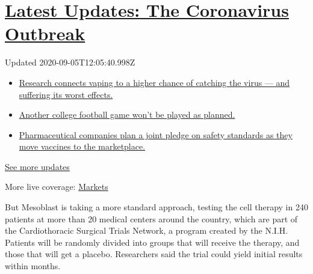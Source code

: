 \hypertarget{latest-updates-the-coronavirus-outbreak}{%
\section{\texorpdfstring{\href{https://www.nytimes3xbfgragh.onion/2020/09/04/world/covid-19-coronavirus.html?action=click\&pgtype=Article\&state=default\&region=MAIN_CONTENT_1\&context=storylines_live_updates}{Latest
Updates: The Coronavirus
Outbreak}}{Latest Updates: The Coronavirus Outbreak}}\label{latest-updates-the-coronavirus-outbreak}}

Updated 2020-09-05T12:05:40.998Z

\begin{itemize}
\tightlist
\item
  \href{https://www.nytimes3xbfgragh.onion/2020/09/04/world/covid-19-coronavirus.html?action=click\&pgtype=Article\&state=default\&region=MAIN_CONTENT_1\&context=storylines_live_updates\#link-1654f6ad}{Research
  connects vaping to a higher chance of catching the virus --- and
  suffering its worst effects.}
\item
  \href{https://www.nytimes3xbfgragh.onion/2020/09/04/world/covid-19-coronavirus.html?action=click\&pgtype=Article\&state=default\&region=MAIN_CONTENT_1\&context=storylines_live_updates\#link-52e4198a}{Another
  college football game won't be played as planned.}
\item
  \href{https://www.nytimes3xbfgragh.onion/2020/09/04/world/covid-19-coronavirus.html?action=click\&pgtype=Article\&state=default\&region=MAIN_CONTENT_1\&context=storylines_live_updates\#link-181cef0}{Pharmaceutical
  companies plan a joint pledge on safety standards as they move
  vaccines to the marketplace.}
\end{itemize}

\href{https://www.nytimes3xbfgragh.onion/2020/09/04/world/covid-19-coronavirus.html?action=click\&pgtype=Article\&state=default\&region=MAIN_CONTENT_1\&context=storylines_live_updates}{See
more updates}

More live coverage:
\href{https://www.nytimes3xbfgragh.onion/live/2020/09/04/business/stock-market-today-coronavirus?action=click\&pgtype=Article\&state=default\&region=MAIN_CONTENT_1\&context=storylines_live_updates}{Markets}

But Mesoblast is taking a more standard approach, testing the cell
therapy in 240 patients at more than 20 medical centers around the
country, which are part of the Cardiothoracic Surgical Trials Network, a
program created by the N.I.H. Patients will be randomly divided into
groups that will receive the therapy, and those that will get a placebo.
Researchers said the trial could yield initial results within months.

